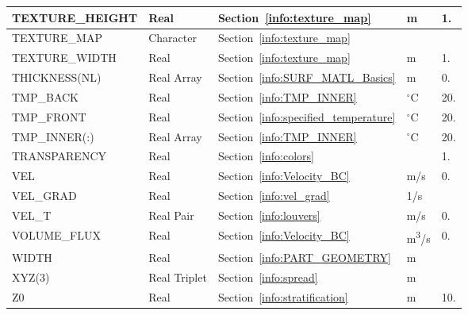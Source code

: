 \documentclass[11pt]{book}
\begin{document}
\begin{longtable}{@{\extracolsep{\fill}}|l|l|l|l|l|}
{\ct TEXTURE\_HEIGHT}                 & Real            & Section~\ref{info:texture_map}            & m                   & 1.                      \\ \hline
{\ct TEXTURE\_MAP}                    & Character       & Section~\ref{info:texture_map}            &                     &                         \\ \hline
{\ct TEXTURE\_WIDTH}                  & Real            & Section~\ref{info:texture_map}            & m                   & 1.                      \\ \hline
{\ct THICKNESS(NL)}                   & Real Array      & Section~\ref{info:SURF_MATL_Basics}       & m                   & 0.                      \\ \hline
{\ct TMP\_BACK}                       & Real            & Section~\ref{info:TMP_INNER}              & $^\circ$C           & 20.                     \\ \hline
{\ct TMP\_FRONT}                      & Real            & Section~\ref{info:specified_temperature}  & $^\circ$C           & 20.                     \\ \hline
{\ct TMP\_INNER(:)}                   & Real Array      & Section~\ref{info:TMP_INNER}              & $^\circ$C           & 20.                     \\ \hline
{\ct TRANSPARENCY}                    & Real            & Section~\ref{info:colors}                 &                     & 1.                      \\ \hline
{\ct VEL    }                         & Real            & Section~\ref{info:Velocity_BC}            & m/s                 & 0.                      \\ \hline
{\ct VEL\_GRAD}                       & Real            & Section~\ref{info:vel_grad}               & 1/s                 &                         \\ \hline
{\ct VEL\_T }                         & Real Pair       & Section~\ref{info:louvers}                & m/s                 & 0.                      \\ \hline
{\ct VOLUME\_FLUX}                    & Real            & Section~\ref{info:Velocity_BC}            & \si{m^3/s}          & 0.                      \\ \hline
{\ct WIDTH}                           & Real            & Section~\ref{info:PART_GEOMETRY}          & m                   &                         \\ \hline
{\ct XYZ(3)}                          & Real Triplet    & Section~\ref{info:spread}                 & m                   &                         \\ \hline
{\ct Z0 }                             & Real            & Section~\ref{info:stratification}         & m                   & 10.                     \\ \hline
\end{longtable}
\end{document}
